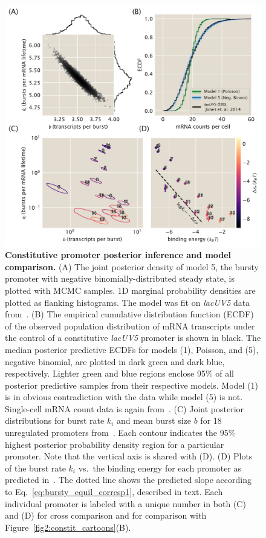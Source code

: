 \begin{figure}%
\centering
\includegraphics[width=\textwidth]{../../figures/main/fig03.pdf}
\caption{\textbf{Constitutive promoter posterior inference and model
comparison.} (A) The joint posterior density of model 5, the bursty promoter
with negative binomially-distributed steady state, is plotted with MCMC samples.
1D marginal probability densities are plotted as flanking histograms. The model
was fit on \textit{lacUV5} data from~\cite{Jones2014}. (B) The empirical
cumulative distribution function (ECDF) of the observed population distribution
of mRNA transcripts under the control of a constitutive \textit{lacUV5} promoter
is shown in black. The median posterior predictive ECDFs for models (1),
Poisson, and (5), negative binomial, are plotted in dark green and dark blue,
respectively. Lighter green and blue regions enclose 95\% of all posterior
predictive samples from their respective models. Model (1) is in obvious
contradiction with the data while model (5) is not. Single-cell mRNA count data
is again from~\cite{Jones2014}. (C) Joint posterior distributions for burst rate
$k_i$ and mean burst size $b$ for 18 unregulated promoters
from~\cite{Jones2014}. Each contour indicates the 95\% highest posterior
probability density region for a particular promoter. Note that the vertical
axis is shared with (D). (D) Plots of the burst rate $k_i$ vs.\ the binding
energy for each promoter as predicted in~\cite{Brewster2012}. The dotted line
shows the predicted slope according to Eq.~\ref{eq:bursty_equil_corresp1},
described in text. Each individual promoter is labeled with a unique number in
both (C) and (D) for cross comparison and for comparison with
Figure~\ref{fig2:constit_cartoons}(B).}
\label{fig:constit_post_full}
\end{figure}

